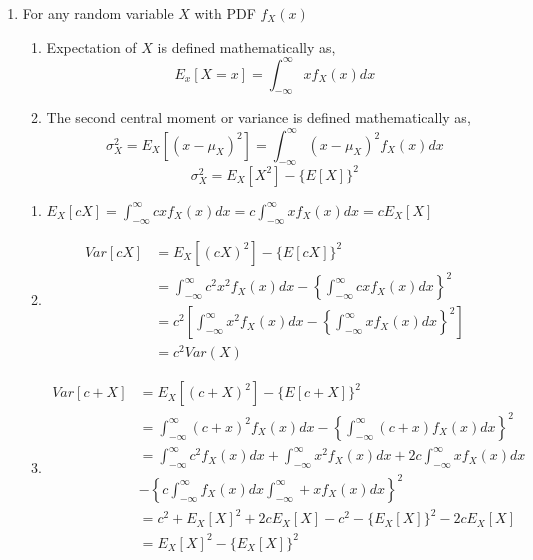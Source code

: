 \documentclass[11pt]{article}
\begin{document}
\begin{enumerate}[1: ]
\item For any random variable $X$ with PDF $f_X(x)$
\begin{enumerate}[$(i)$ ]
\item Expectation of $X$ is defined mathematically as,
	\begin{equation}
		E_x[X=x] = \int_{-\infty}^\infty x f_X(x) dx
	\end{equation}
\item The second central moment or variance is defined mathematically as,
	\begin{equation*}
	\sigma_X^2 = E_X[(x-\mu_X)^2]=\int_{-\infty}^\infty (x-\mu_X)^2 f_X(x)dx
	\end{equation*}
	\begin{equation}
		\sigma_X^2 = E_X[X^2] - \{ E[X]\}^2	\label{sigmaeq}
	\end{equation}
\end{enumerate}
\begin{enumerate}[$(a)$ ]
\item \qquad \quad $E_X[cX] = \displaystyle \int_{-\infty}^\infty cx f_X(x) dx
	= c\int_{-\infty}^\infty x f_X(x) dx = c E_X[X] $
\item 
	\begin{align*}
	Var[cX] &= E_X[(cX)^2] - \{ E[cX]\}^2 \\
		&= \int_{-\infty}^\infty c^2 x^2 f_X(x) dx 
		-\left\{\int_{-\infty}^\infty cx f_X(x) dx \right\}^2 \\
		&= c^2 \left[\int_{-\infty}^\infty x^2 f_X(x) dx 
		-\left\{\int_{-\infty}^\infty x f_X(x) dx \right\}^2 \right] \\
		&= c^2 Var(X)
	\end{align*}
\item 
	\begin{align*}
	Var[c+X] &= E_X[(c+X)^2] - \{ E[c+X]\}^2 \\
		&= \int_{-\infty}^\infty (c+x)^2 f_X(x) dx 
		-\left\{\int_{-\infty}^\infty (c+x) f_X(x) dx \right\}^2 \\
		&= \int_{-\infty}^\infty c^2 f_X(x) dx 
			+ \int_{-\infty}^\infty x^2 f_X(x) dx 
			+ 2c\int_{-\infty}^\infty x f_X(x) dx \\
		&-\left\{ c \int_{-\infty}^\infty f_X(x) dx 
		 	\int_{-\infty}^\infty + x f_X(x) dx \right\}^2 \\
		&=c^2+ E_X[X]^2 + 2c E_X[X] -c^2 - \{ E_X[X]\}^2 -2c E_X[X] \\
		&=E_X[X]^2 - \{ E_X[X]\}^2 \\

\end{align*}
\end{enumerate}
\end{enumerate}
\end{document}
